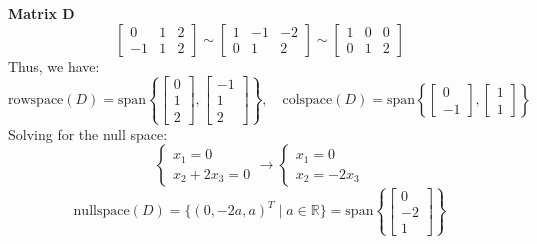 \documentclass{article}
\begin{document}
\noindent\textbf{Matrix D}
$$
\begin{bmatrix} 0 & 1 & 2 \\ -1 & 1 & 2 \end{bmatrix} \sim
\begin{bmatrix} 1 & -1 & -2 \\ 0 & 1 & 2 \end{bmatrix} \sim
\begin{bmatrix} 1 & 0 & 0 \\ 0 & 1 & 2 \end{bmatrix}
$$
Thus, we have:
$$
\text{rowspace}(D) = \text{span}\left\{ \begin{bmatrix} 0 \\ 1 \\ 2 \end{bmatrix}, \begin{bmatrix} -1 \\ 1 \\ 2 \end{bmatrix} \right\}, \quad
\text{colspace}(D) = \text{span}\left\{ \begin{bmatrix} 0 \\ -1 \end{bmatrix}, \begin{bmatrix} 1 \\ 1 \end{bmatrix} \right\}
$$
Solving for the null space:
$$
\begin{cases} x_1 = 0 \\ x_2 + 2x_3 = 0 \end{cases}
\rightarrow
\begin{cases} x_1 = 0 \\ x_2 = -2x_3 \end{cases}
$$
$$
\text{nullspace}(D) = \{(0, -2a, a)^T \mid a \in \mathbb{R} \} = \text{span}\left\{ \begin{bmatrix} 0 \\ -2 \\ 1 \end{bmatrix} \right\}
$$

\newpage
\end{document}
